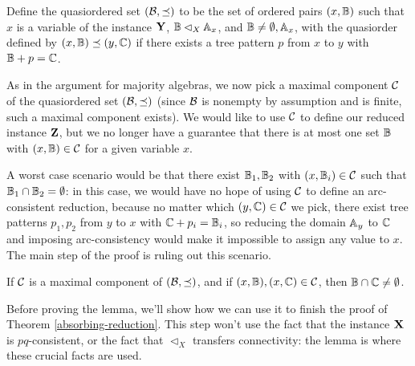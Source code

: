 \documentclass[letterpaper,11pt]{article}
\begin{document}
\begin{defn} Define the quasiordered set $(\mathcal{B}, \preceq)$ to be the set of ordered pairs $(x,\mathbb{B})$ such that $x$ is a variable of the instance $\mathbf{Y}$, $\mathbb{B} \lhd_X \mathbb{A}_x$, and $\mathbb{B} \ne \emptyset,\mathbb{A}_x$, with the quasiorder defined by $(x,\mathbb{B}) \preceq (y,\mathbb{C})$ if there exists a tree pattern $p$ from $x$ to $y$ with $\mathbb{B} + p = \mathbb{C}$.
\end{defn}

As in the argument for majority algebras, we now pick a maximal component $\mathcal{C}$ of the quasiordered set $(\mathcal{B},\preceq)$ (since $\mathcal{B}$ is nonempty by assumption and is finite, such a maximal component exists). We would like to use $\mathcal{C}$ to define our reduced instance $\mathbf{Z}$, but we no longer have a guarantee that there is at most one set $\mathbb{B}$ with $(x,\mathbb{B}) \in \mathcal{C}$ for a given variable $x$.

A worst case scenario would be that there exist $\mathbb{B}_1, \mathbb{B}_2$ with $(x,\mathbb{B}_i) \in \mathcal{C}$ such that $\mathbb{B}_1 \cap \mathbb{B}_2 = \emptyset$: in this case, we would have no hope of using $\mathcal{C}$ to define an arc-consistent reduction, because no matter which $(y,\mathbb{C}) \in \mathcal{C}$ we pick, there exist tree patterns $p_1, p_2$ from $y$ to $x$ with $\mathbb{C} + p_i = \mathbb{B}_i$, so reducing the domain $\mathbb{A}_y$ to $\mathbb{C}$ and imposing arc-consistency would make it impossible to assign any value to $x$. The main step of the proof is ruling out this scenario.

\begin{lem} If $\mathcal{C}$ is a maximal component of $(\mathcal{B},\preceq)$, and if $(x,\mathbb{B}), (x,\mathbb{C}) \in \mathcal{C}$, then $\mathbb{B} \cap \mathbb{C} \ne \emptyset$.
\end{lem}

Before proving the lemma, we'll show how we can use it to finish the proof of Theorem \ref{absorbing-reduction}. This step won't use the fact that the instance $\mathbf{X}$ is $pq$-consistent, or the fact that $\lhd_X$ transfers connectivity: the lemma is where these crucial facts are used.
\end{document}
